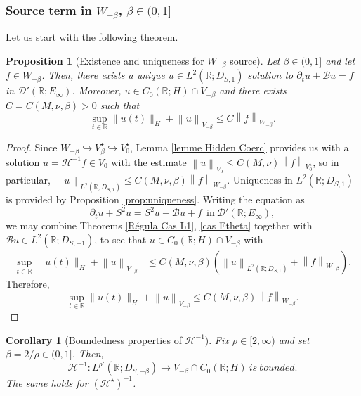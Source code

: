 \documentclass[11pt, letterpaper]{amsart}
\newtheorem{cor}[thm]{Corollary}
\newtheorem{prop}[thm]{Proposition}
\theoremstyle{definition}
\theoremstyle{remark}
\numberwithin{equation}{section}
\begin{document}
{\subsubsection{Source term in $W_{-\beta}$, $\beta \in (0,1]$} Let us start with the following theorem.
\begin{prop}[Existence and uniqueness for $W_{-\beta}$ source] \label{prop:W-beta}
Let $\beta \in (0,1]$ and let $f \in W_{-\beta}$. Then, there exists a unique $u \in L^2(\mathbb{R};D_{S,1})$ solution to $\partial_t u +\mathcal{B} u =f$ in $\mathcal{D}'(\mathbb{R};E_\infty)$. Moreover, $u \in C_0(\mathbb{R}; H)\cap V_{-\beta}$ and there exists $C=C(M,\nu,\beta)>0$ such that 
\begin{equation*}\label{,}
       \sup_{t\in \mathbb{R}} \| u(t) \|_{H}+ \left \| u \right \|_{V_{-\beta}} \leq C\left \| f \right \|_{W_{-\beta}}.
\end{equation*}
    \end{prop}
\begin{proof}
 Since $W_{-\beta} \hookrightarrow V_{\beta}^\star \hookrightarrow V_0^\star$, Lemma \ref{lemme Hidden Coerc} provides us with a solution $u=\mathcal{H}^{-1}f \in V_0$ with the estimate  $\left \| u \right \|_{V_0} \leq C(M,\nu) \left \| f \right \|_{V_0^\star}$, so  in  particular,  $\left \| u \right \|_{L^2(\mathbb{R};D_{S,1})} \leq C(M,\nu, \beta) \left \| f \right \|_{W_{-\beta}}.$ Uniqueness in $L^2(\mathbb{R};D_{S,1})$  is provided by Proposition \ref{prop:uniqueness}.
Writing the equation as $$\partial_t u +S^2 u= S^2u -\mathcal{B}u+f \ \ \mathrm{in} \ \mathcal{D}'(\mathbb{R};E_\infty),$$ 
we may combine Theorems \ref{Régula Cas L1}, \ref{cas Etheta} together with $\mathcal{B}u \in L^2(\mathbb{R};D_{S,-1})$, to see that $u \in C_0(\mathbb{R};H)\cap V_{-\beta}$ with 
\begin{align*}
    \sup_{t\in \mathbb{R}} \| u(t) \|_{H}+\left \| u \right \|_{V_{-\beta}}&\leq C(M,\nu, \beta) \left ( \left \| u \right \|_{L^2(\mathbb{R};D_{S,1})} + \left \| f \right \|_{W_{-\beta}}  \right ).
\end{align*}
Therefore, 
$$\sup_{t\in \mathbb{R}} \| u(t) \|_{H}+ \left \| u \right \|_{V_{-\beta}} \leq C(M,\nu,\beta)\left \| f \right \|_{W_{-\beta}}.$$
\end{proof}



\begin{cor}[Boundedness properties of $\mathcal{H}^{-1}  $]\label{Cas L^2 pour L^r}
Fix $\rho \in [2,\infty)$ and set $\beta={2}/{\rho}\in (0,1]$. Then, 
$$\mathcal{H}^{-1} : L^{\rho'}(\mathbb{R};D_{S,-\beta}) \rightarrow V_{-\beta} \cap C_0(\mathbb{R};H) \ is \ bounded.$$  The same holds for $(\mathcal{H}^\star)^{-1}$.
\end{cor}

}
\end{document}
